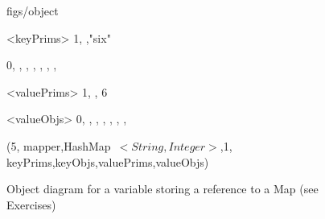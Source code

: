 



\begin {figure}


\Draw

 {figs/object}


\Indirect \Table <keyPrims>
 {  1, ,"six" }
  
\Indirect {}
 {  0, , , , , , ,  }

\Indirect \Table <valuePrims>
 {  1, , 6 }
  
\Indirect \Table <valueObjs>
 {  0, , , , , , ,  }
  

\Obj (5, mapper,HashMap~$<String{,}Integer>$,1, 
   keyPrims,keyObjs,valuePrims,valueObjs)
    
\EndDraw

\caption {Object diagram for a variable storing a
reference to a Map (see Exercises)}

\label {fig:MapEx}

\end {figure}


